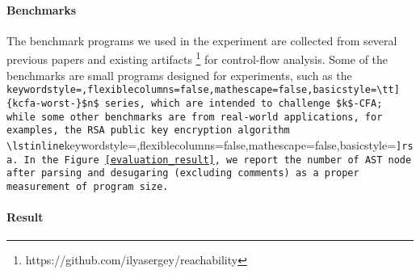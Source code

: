 \paragraph{Benchmarks}
The benchmark programs we used in the experiment are collected from several
previous papers \cite{Johnson:2013:OAA:2500365.2500604, ashley:practical,
DBLP:journals/corr/abs-1102-3676} and existing artifacts
\footnote{https://github.com/ilyasergey/reachability} for control-flow
analysis.  Some of the benchmarks are small programs designed for
experiments, such as the \lstinline[keywordstyle=,flexiblecolumns=false,mathescape=false,basicstyle=\tt]{kcfa-worst-}$n$ series, which are intended
to challenge $k$-CFA; while some other benchmarks are from real-world
applications, for examples, the RSA public key encryption algorithm
\lstinline[keywordstyle=,flexiblecolumns=false,mathescape=false,basicstyle=\tt]{rsa}. In the Figure \ref{evaluation_result}, we report the number of
AST node after parsing and desugaring (excluding comments) as a proper
measurement of program size.

\paragraph{Result}

